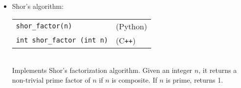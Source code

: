 \documentclass{article}
\newcommand{\cpp}{C{}\texttt{++}}
\begin{document}
\begin{itemize}
\item Shor's algorithm: \\
\begin{tabular}{ll}
\verb~shor_factor(n)~ & (Python) \\
\verb~int shor_factor (int n)~ & (\cpp) 
\end{tabular} \\
Implements Shor's factorization algorithm. Given an integer $n$, it returns a non-trivial prime factor of $n$ if $n$ is composite. If $n$ is prime, returns 1. 

\end{itemize} 
\end{document}
